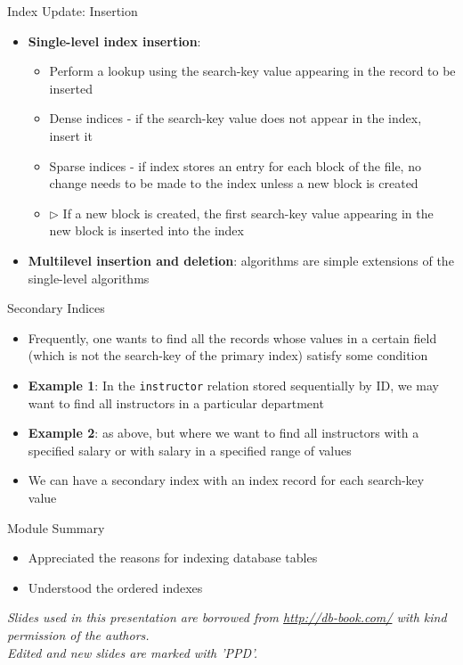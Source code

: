 \documentclass[aspectratio=169, xcolor=dvipsnames]{beamer}
\begin{document}
\begin{frame}{Index Update: Insertion}
    \begin{itemize}[<+->]
        \item \textbf{Single-level index insertion}:
        \begin{itemize}[<+->]
            \item Perform a lookup using the search-key value appearing in the record to be inserted
            \item Dense indices - if the search-key value does not appear in the index, insert it
            \item Sparse indices - if index stores an entry for each block of the file, no change needs to be made to the index unless a new block is created
            \item $\triangleright$ If a new block is created, the first search-key value appearing in the new block is inserted into the index
        \end{itemize}
        \item \textbf{Multilevel insertion and deletion}: algorithms are simple extensions of the single-level algorithms
    \end{itemize}
\end{frame}

\begin{frame}{Secondary Indices}
    \begin{itemize}[<+->]
        \item Frequently, one wants to find all the records whose values in a certain field (which is not the search-key of the primary index) satisfy some condition
        \item \textbf{Example 1}: In the \texttt{instructor} relation stored sequentially by ID, we may want to find all instructors in a particular department
        \item \textbf{Example 2}: as above, but where we want to find all instructors with a specified salary or with salary in a specified range of values
        \item We can have a secondary index with an index record for each search-key value
    \end{itemize}
\end{frame}


\begin{frame}{Module Summary}
    \begin{block}{}
        \begin{itemize}[<+->]
            \item Appreciated the reasons for indexing database tables
            \item Understood the ordered indexes
        \end{itemize}
    \end{block}
    \vspace{2em}
    \begin{center}
    \small \textit{Slides used in this presentation are borrowed from \url{http://db-book.com/} with kind permission of the authors.} \\
    \small \textit{Edited and new slides are marked with 'PPD'.}
    \end{center}
\end{frame}
\end{document}
